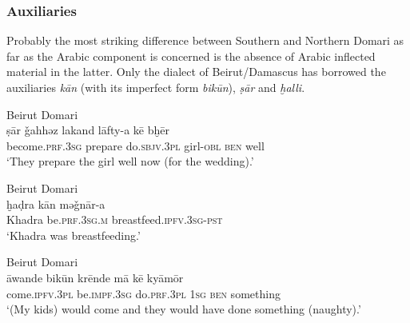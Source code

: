 \documentclass[output=paper]{langsci/langscibook}
\begin{document}
 \subsubsection{Auxiliaries}

Probably the most striking difference between Southern and Northern Domari as far as the Arabic component is concerned is the absence of Arabic inflected material in the latter. Only the dialect of Beirut/Damascus has borrowed the auxiliaries \textit{kān} (with its imperfect form \textit{bikūn}), \textit{ṣār} and \textit{ḫalli}.

\ea
{Beirut Domari}\\ \label{sar}
\gll ṣār \v{g}ahhəz lakand lāfty-a kē bḫēr\\
     become.\textsc{prf.3sg} prepare do\textsc{.sbjv.3pl} girl\textsc{{}-obl} \textsc{ben} well\\
\glt ‘They prepare the girl well now (for the wedding).’
\z

\ea \label{xadra}
{Beirut Domari}\\
\gll ḫaḍra kān mə\v{g}nār-a\\
     Khadra be.\textsc{prf.3sg.m} breastfeed.\textsc{ipfv.3sg-pst}\\
\glt ‘Khadra was breastfeeding.’
\z

\ea \label{awande}
{Beirut Domari}\\
\gll āwande bikūn krēnde mā kē kyāmōr\\
     come.\textsc{ipfv.3pl} be.\textsc{impf.3sg} do.\textsc{prf.3pl} \textsc{1sg} \textsc{ben} something\\
\glt ‘(My kids) would come and they would have done something (naughty).’ 
\z
\end{document}
